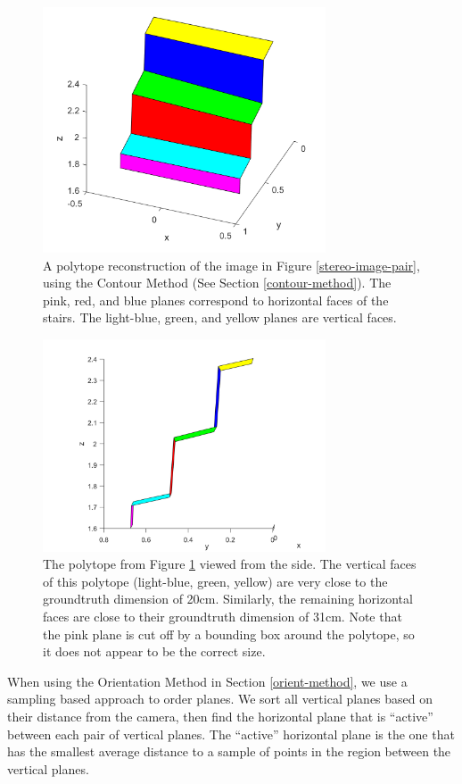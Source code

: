 \begin{figure}[!h]
\centering
\includegraphics[width=3.3in]{Sections/Figures/polytope_example.png}
\caption{A polytope reconstruction of the image in Figure \ref{stereo-image-pair}, using the Contour Method (See Section \ref{contour-method}). The pink, red, and blue planes correspond to horizontal faces of the stairs. The light-blue, green, and yellow planes are vertical faces.}
\label{polytope-diagonal-contour}
\end{figure}

\begin{figure}[!h]
\centering
\includegraphics[width=3.3in]{Sections/Figures/polytope_sideview.png}
\caption{The polytope from Figure \ref{polytope-diagonal-contour} viewed from the side. The vertical faces of this polytope (light-blue, green, yellow) are very close to the groundtruth dimension of 20cm. Similarly, the remaining horizontal faces are close to their groundtruth dimension of 31cm. Note that the pink plane is cut off by a bounding box around the polytope, so it does not appear to be the correct size.}
\label{polytope-sideview-contour}
\end{figure}

When using the Orientation Method in Section \ref{orient-method}, we use a sampling based approach to order planes. We sort all vertical planes based on their distance from the camera, then find the horizontal plane that is ``active'' between each pair of vertical planes. The ``active'' horizontal plane is the one that has the smallest average distance to a sample of points in the region between the vertical planes.

